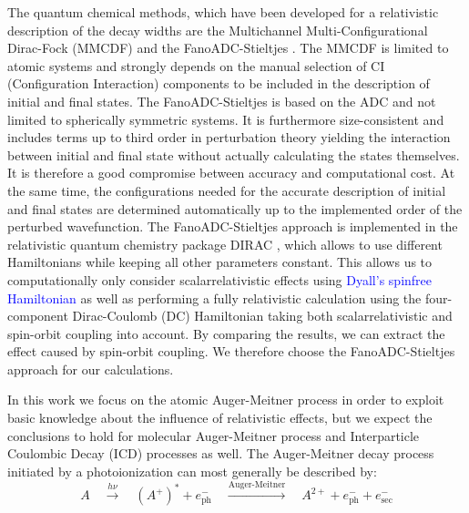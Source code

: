 The quantum chemical methods, which have been developed for a relativistic
description of the decay widths are the Multichannel Multi-Configurational
Dirac-Fock (MMCDF) \cite{Fritzsche11} and the FanoADC-Stieltjes
\textcolor{blue}
{\cite{Averbukh05,Fasshauer15_1}}.
The MMCDF is limited to atomic systems and strongly depends on
the manual selection of CI (Configuration
Interaction) components to be included in the description of initial and      
final states.
The FanoADC-Stieltjes is based on the ADC and not limited to spherically symmetric
systems.
It is furthermore size-consistent and includes terms up to third order
in perturbation theory yielding the interaction between initial and final state
without actually calculating the states themselves.
It is therefore a good compromise between
accuracy and computational cost. At the same time, the configurations needed for the
accurate description of initial and final states are determined automatically up to
the implemented order of the perturbed wavefunction.
The FanoADC-Stieltjes approach is implemented in the relativistic
quantum chemistry package
DIRAC \cite{DIRAC17}, which allows to use different Hamiltonians while keeping
all other parameters constant. This allows us to computationally only consider
scalarrelativistic effects using
\textcolor{blue}
{Dyall's spinfree Hamiltonian \cite{Dyall94}}
as well as
performing a fully relativistic calculation using the four-component
Dirac-Coulomb (DC) Hamiltonian taking both scalarrelativistic and
spin-orbit coupling into account.
By comparing the results, we can extract the effect caused by spin-orbit coupling.
We therefore choose the FanoADC-Stieltjes approach for our calculations.


In this work we focus on the atomic Auger-Meitner process     
in order                                      
to exploit basic knowledge about the influence of relativistic effects,
but we expect the conclusions to hold for molecular Auger-Meitner process and
Interparticle Coulombic Decay (ICD) processes
\cite{Cederbaum97,Marburger03,Hergenhahn11,Jahnke15} as well.
The Auger-Meitner decay process initiated by a photoionization
can most generally be described by:
\begin{equation*}                                               
 A \quad \xrightarrow{h\nu}\quad (A^+)^* + e^-_\text{ph} \quad       
    \xrightarrow{\text{Auger-Meitner}} \quad A^{2+} + e^-_\text{ph} + e^-_\text{sec}     
\end{equation*}                                                 
                                                                
